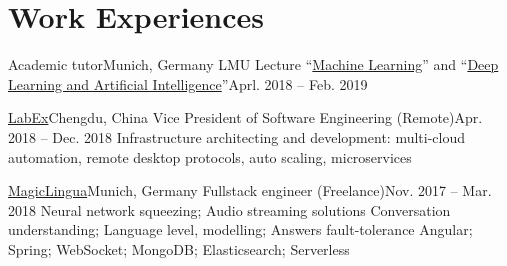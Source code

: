\section{\textbf{Work Experiences}}
  \resumeSubHeadingListStart

    \resumeSubheading
      {Academic tutor}{Munich, Germany}
      {LMU Lecture ``\href{http://www.dbs.ifi.lmu.de/cms/studium_lehre/lehre_master/ml18/index.html}{Machine Learning}'' and ``\href{http://www.dbs.ifi.lmu.de/cms/studium_lehre/lehre_master/deep1819/index.html}{Deep Learning and Artificial Intelligence}''}{Aprl. 2018 -- Feb. 2019}
      \resumeItemListStart
      \resumeItemListEnd

    \resumeSubheading
      {\href{https://labex.io/}{LabEx}}{Chengdu, China}
      {Vice President of Software Engineering (Remote)}{Apr. 2018 -- Dec. 2018}
      \resumeItemListStart
        {
          Infrastructure architecting and development: 
          multi-cloud automation, remote desktop protocols, auto scaling, microservices
        }
      \resumeItemListEnd

    \resumeSubheading
    {\href{https://magiclingua.com/}{MagicLingua}}{Munich, Germany}
    {Fullstack engineer (Freelance)}{Nov. 2017 -- Mar. 2018}
    \resumeItemListStart
        {Neural network squeezing; Audio streaming solutions}
        {Conversation understanding; Language level, modelling; Answers fault-tolerance}
        {Angular; Spring; WebSocket; MongoDB; Elasticsearch; Serverless}
    \resumeItemListEnd

